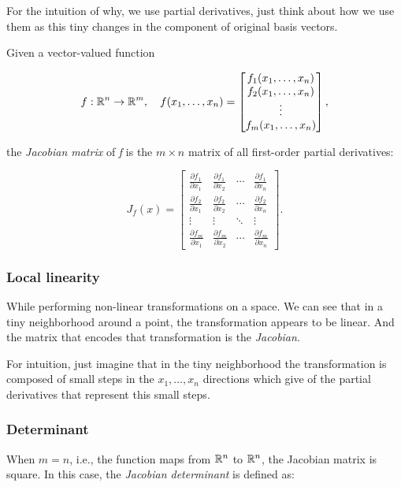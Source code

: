 For the intuition of why, we use partial derivatives, just think about
how we use them as this tiny changes in the component of original
basis vectors.

Given a vector-valued function

\[
    f : \mathbb{R}^n \rightarrow \mathbb{R}^m, \quad f(x_1, \ldots, x_n) = 
    \begin{bmatrix}
    f_1(x_1, \ldots, x_n) \\
    f_2(x_1, \ldots, x_n) \\
    \vdots \\
    f_m(x_1, \ldots, x_n)
    \end{bmatrix},
\]

the \emph{Jacobian matrix} of \emph{f} is the \(m \times n\) matrix of all first-order partial derivatives:

\[
    J_f(x) = 
    \begin{bmatrix}
    \frac{\partial f_1}{\partial x_1} & \frac{\partial f_1}{\partial x_2} & \cdots & \frac{\partial f_1}{\partial x_n} \\
    \frac{\partial f_2}{\partial x_1} & \frac{\partial f_2}{\partial x_2} & \cdots & \frac{\partial f_2}{\partial x_n} \\
    \vdots & \vdots & \ddots & \vdots \\
    \frac{\partial f_m}{\partial x_1} & \frac{\partial f_m}{\partial x_2} & \cdots & \frac{\partial f_m}{\partial x_n}
    \end{bmatrix}.
\]

\subsubsection{Local linearity}

While performing non-linear transformations on a space. We can see that in a tiny neighborhood
around a point, the transformation appears to be linear. And the matrix that encodes that
transformation is the \emph{Jacobian}.

For intuition, just imagine that in the tiny neighborhood the transformation is composed
of small steps in the \(x_1, \dots, x_n\) directions which give of the partial derivatives that
represent this small steps. 

\subsubsection{Determinant}
When \(m = n\), i.e., the function maps from 
\(\mathbb{R}^n\) to \(\mathbb{R}^n\), 
the Jacobian matrix is square. In this case, 
the \emph{Jacobian determinant} is defined as:

